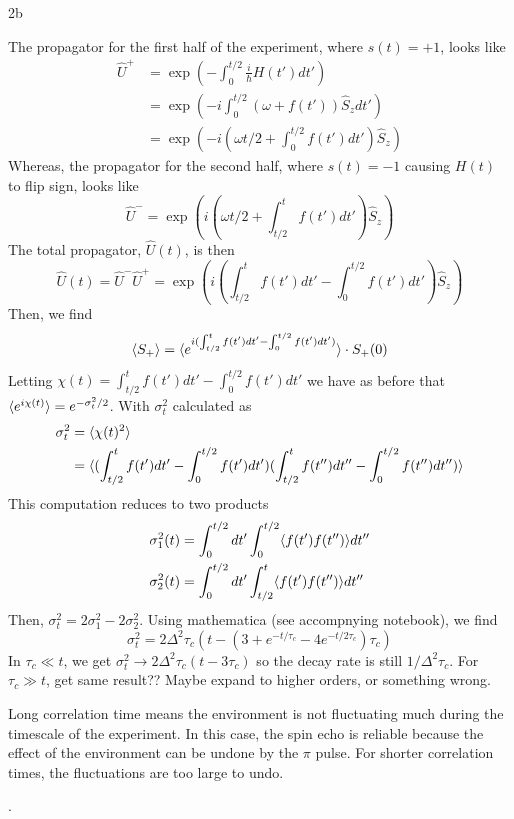 \documentclass[12pt]{article}
\begin{document}
\begin{exc}{2b}

\end{exc}
\begin{ans}
    The propagator for the first half of the experiment, where $s(t) = +1$, looks like 
    \begin{align*}
        \hat U^{+} 
        &= \exp(-\int_{0}^{t/2}\frac i\hbar H(t') dt')\\
        &= \exp(-i\int_{0}^{t/2}(\omega + f(t')) \hat S_z dt')\\
        &= \exp(-i(\omega t/2 + \int_0^{t/2}f(t')dt')\hat S_z)        
    \end{align*}
    Whereas, the propagator for the second half, where $s(t) = -1$ causing $H(t)$ to flip sign, looks like 
    \[
        \hat U^{-} = \exp(i(\omega t/2 + \int_{t/2}^{t}f(t')dt')\hat S_z) 
    \]
    The total propagator, $\hat U(t)$, is then 
    \[\hat U(t) = \hat U^{-}\hat U^{+} = \exp(i (\int_{t/2}^{t}f(t')dt' - \int_{0}^{t/2}f(t')dt')\hat S_z)\]
    Then, we find 
    \[\langle{S_+}\rangle = \langle{e^{i(\int_{t/2}^{t}f(t')dt' - \int_{0}^{t/2}f(t')dt')} }\rangle\cdot S_+(0)\]
    Letting $\chi(t) = \int_{t/2}^{t}f(t')dt' - \int_{0}^{t/2}f(t')dt'$ we have as before that $\langle{e^{i\chi(t)}}\rangle = e^{-\sigma_t^2/2}$. With $\sigma_t^2$ calculated as 
    \begin{align*}
        \sigma_t^2 &= \langle{\chi(t)^2}\rangle\\
        &= \langle{(\int_{t/2}^{t}f(t')dt' - \int_{0}^{t/2}f(t')dt')(\int_{t/2}^{t}f(t'')dt'' - \int_{0}^{t/2}f(t'')dt'')}\rangle
    \end{align*}
    This computation reduces to two products 
    \begin{align*}
        \sigma^2_1(t) &= \int_{0}^{t/2}dt'\int_{0}^{t/2}\langle{f(t')f(t'')}\rangle dt''\\
        \sigma^2_2(t) &= \int_{0}^{t/2}dt'\int_{t/2}^{t}\langle{f(t')f(t'')}\rangle dt''
    \end{align*}
    Then, $\sigma_t^2 = 2\sigma^2_1 - 2\sigma^2_2$. Using mathematica (see accompnying notebook), we find 
    \[\sigma_t^2 = 2\Delta^2\tau_c(t  - (3 + e^{-t/\tau_c} - 4e^{-t/2\tau_c})\tau_c)\]
    In $\tau_c \ll t$, we get $\sigma_t^2 \to 2\Delta^2\tau_c(t - 3\tau_c)$ so the decay rate is still $1/\Delta^2\tau_c$. For $\tau_c \gg t$, get same result?? Maybe expand to higher orders, or something wrong.

    Long correlation time means the environment is not fluctuating much during the timescale of the experiment. In this case, the spin echo is reliable because the effect of the environment can be undone by the $\pi$ pulse. For shorter correlation times, the fluctuations are too large to undo.
\end{ans}.
\end{document}
